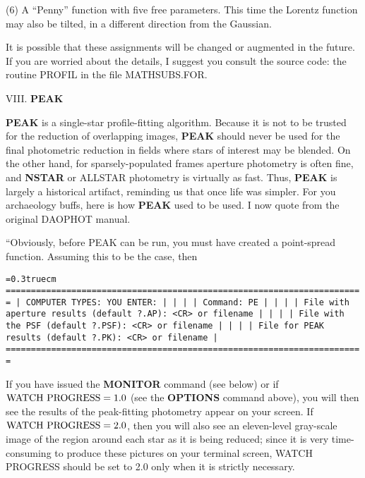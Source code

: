 \item{(6)} A ``Penny'' function with five free parameters.  This time
the Lorentz function may also be tilted, in a different direction
from the Gaussian.

It is possible that these assignments will be changed or augmented in
the future.  If you are worried about the details, I suggest you
consult the source code:  the routine PROFIL in the file MATHSUBS.FOR.

\vfill
\eject
\noindent VIII.  {\bf PEAK}

{\bf PEAK} is a single-star profile-fitting algorithm.  Because it is
not to be trusted for the reduction of overlapping images, {\bf PEAK}
should never be used for the final photometric reduction in fields
where stars of interest may be blended. On the other hand, for
sparsely-populated frames aperture photometry is often fine, and {\bf
NSTAR} or ALLSTAR photometry is virtually as fast.  Thus, {\bf
PEAK} is largely a historical artifact, reminding us that once life was
simpler. For you archaeology buffs, here is how {\bf PEAK} used to be
used.  I now quote from the original DAOPHOT manual.

``Obviously, before PEAK can be run, you must have created a
point-spread function.  Assuming this to be the case, then

\bigskip
{\noindent\obeylines\obeyspaces\frenchspacing\tt\baselineskip=0.3truecm
=======================================================================
| COMPUTER TYPES:                                  YOU ENTER:         |
|                                                                     |
| Command:                                         PE                 |
|                                                                     |
|     File with aperture results (default ?.AP):   <CR> or filename   |
|                                                                     |
|             File with the PSF (default ?.PSF):   <CR> or filename   |
|                                                                     |
|          File for PEAK results (default ?.PK):   <CR> or filename   |
=======================================================================
}
\bigskip

\noindent If you have issued the {\bf MONITOR} command (see below) or
if $\hbox{\rm WATCH PROGRESS} = 1.0$ (see the {\bf OPTIONS} command
above), you will then see the results of the peak-fitting photometry
appear on your screen.  If $\hbox{\rm WATCH PROGRESS} = 2.0$, then you
will also see an eleven-level gray-scale image of the region around
each star as it is being reduced; since it is very time-consuming to
produce these pictures on your terminal screen, WATCH PROGRESS should
be set to 2.0 only when it is strictly necessary.

